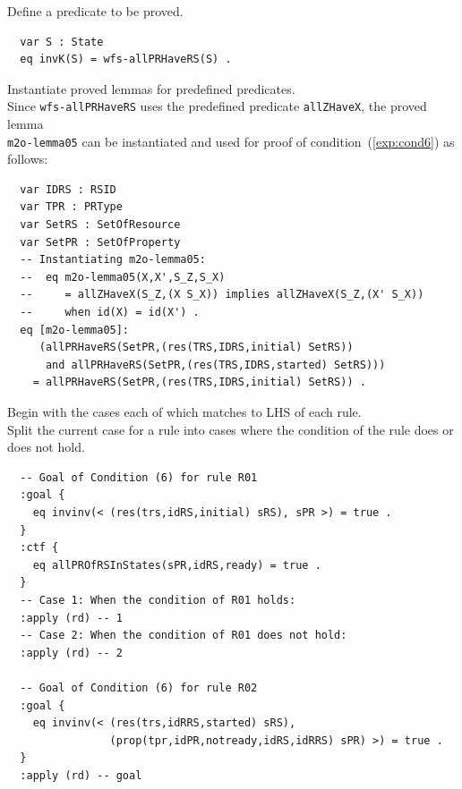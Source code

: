 \documentclass[12pt]{report}
\begin{document}
 Define a predicate to be proved. 
\small
\begin{verbatim}
  var S : State
  eq invK(S) = wfs-allPRHaveRS(S) .
\end{verbatim}
\normalsize

 Instantiate proved lemmas for predefined
predicates. \\ Since {\tt wfs-allPRHaveRS} uses the predefined
predicate {\tt allZHaveX}, the proved lemma \\ {\tt m2o-lemma05} can be
instantiated and used for proof of condition~(\ref{exp:cond6}) as
follows:
\small
\begin{verbatim}
  var IDRS : RSID 
  var TPR : PRType
  var SetRS : SetOfResource
  var SetPR : SetOfProperty
  -- Instantiating m2o-lemma05:
  --  eq m2o-lemma05(X,X',S_Z,S_X) 
  --     = allZHaveX(S_Z,(X S_X)) implies allZHaveX(S_Z,(X' S_X))
  --     when id(X) = id(X') .
  eq [m2o-lemma05]:
     (allPRHaveRS(SetPR,(res(TRS,IDRS,initial) SetRS))
      and allPRHaveRS(SetPR,(res(TRS,IDRS,started) SetRS)))
    = allPRHaveRS(SetPR,(res(TRS,IDRS,initial) SetRS)) .
\end{verbatim}
\normalsize

 Begin with the cases each of which matches to
LHS of each rule. \\ 
 Split the current case for a rule into
cases where the condition of the rule does or does not hold. 
\small
\begin{verbatim}
  -- Goal of Condition (6) for rule R01
  :goal {
    eq invinv(< (res(trs,idRS,initial) sRS), sPR >) = true .
  }
  :ctf {
    eq allPROfRSInStates(sPR,idRS,ready) = true .
  }
  -- Case 1: When the condition of R01 holds:
  :apply (rd) -- 1
  -- Case 2: When the condition of R01 does not hold:
  :apply (rd) -- 2

  -- Goal of Condition (6) for rule R02
  :goal {
    eq invinv(< (res(trs,idRRS,started) sRS),
                (prop(tpr,idPR,notready,idRS,idRRS) sPR) >) = true .
  }
  :apply (rd) -- goal
\end{verbatim}
\normalsize
\end{document}
